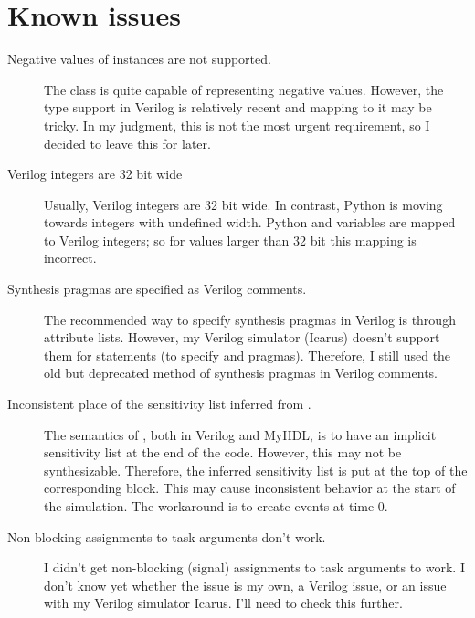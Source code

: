 \documentclass{howto}
\newcommand{\myhdl}{\protect \mbox{MyHDL}}
\begin{document}
\section{Known issues}
\begin{description}

\item[Negative values of  instances are not supported.]
The  class is quite capable of representing negative
values. However, the  type support in Verilog is
relatively recent and mapping to it may be tricky. In my judgment,
this is not the most urgent requirement, so
I decided to leave this for later.

\item[Verilog integers are 32 bit wide]
Usually, Verilog integers are 32 bit wide. In contrast, Python is
moving towards integers with undefined width. Python  
and  variables are mapped to Verilog integers; so for values
larger than 32 bit this mapping is incorrect.

\item[Synthesis pragmas are specified as Verilog comments.] The recommended
way to specify synthesis pragmas in Verilog is through attribute
lists. However, my Verilog simulator (Icarus) doesn't support them
for  statements (to specify  and
 pragmas). Therefore, I still used the old
but deprecated method of synthesis pragmas in Verilog comments.

\item[Inconsistent place of the sensitivity list inferred from .]
The semantics of , both in Verilog and \myhdl{}, is to
have an implicit sensitivity list at the end of the code. However, this
may not be synthesizable. Therefore, the inferred sensitivity list is
put at the top of the corresponding  block.
This may cause inconsistent behavior at the start of the
simulation. The workaround is to create events at time 0.

\item[Non-blocking assignments to task arguments don't work.] 
I didn't get non-blocking (signal) assignments to task arguments to
work.  I don't know yet whether the issue is my own, a Verilog issue,
or an issue with my Verilog simulator Icarus. I'll need to check this
further.


\end{description}
\end{document}

